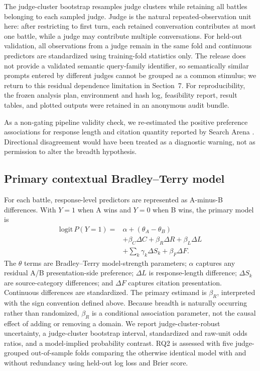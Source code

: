 \documentclass[sigconf,natbib=true,anonymous=true]{acmart}
\begin{document}
The judge-cluster bootstrap resamples judge clusters while retaining all battles belonging to each sampled judge. Judge is the natural repeated-observation unit here: after restricting to first turn, each retained conversation contributes at most one battle, while a judge may contribute multiple conversations. For held-out validation, all observations from a judge remain in the same fold and continuous predictors are standardized using training-fold statistics only. The release does not provide a validated semantic query-family identifier, so semantically similar prompts entered by different judges cannot be grouped as a common stimulus; we return to this residual dependence limitation in Section~7. For reproducibility, the frozen analysis plan, environment and hash log, feasibility report, result tables, and plotted outputs were retained in an anonymous audit bundle.

As a non-gating pipeline validity check, we re-estimated the positive preference associations for response length and citation quantity reported by Search Arena \citep{miroyan2026searcharena}. Directional disagreement would have been treated as a diagnostic warning, not as permission to alter the breadth hypothesis.

\subsection{Primary contextual Bradley--Terry model}
For each battle, response-level predictors are represented as A-minus-B differences. With $Y=1$ when A wins and $Y=0$ when B wins, the primary model is
\begin{align}
\mathrm{logit}\,P(Y=1) ={}& \alpha + (\theta_A-\theta_B) \\
&+ \beta_C\Delta C + \beta_R\Delta R + \beta_L\Delta L \\
&+ \sum_k \gamma_k\Delta S_k + \beta_F\Delta F.
\end{align}
The $\theta$ terms are Bradley--Terry model-strength parameters; $\alpha$ captures any residual A/B presentation-side preference; $\Delta L$ is response-length difference; $\Delta S_k$ are source-category differences; and $\Delta F$ captures citation presentation. Continuous differences are standardized. The primary estimand is $\beta_R$, interpreted with the sign convention defined above. Because breadth is naturally occurring rather than randomized, $\beta_R$ is a conditional association parameter, not the causal effect of adding or removing a domain. We report judge-cluster-robust uncertainty, a judge-cluster bootstrap interval, standardized and raw-unit odds ratios, and a model-implied probability contrast. RQ2 is assessed with five judge-grouped out-of-sample folds comparing the otherwise identical model with and without redundancy using held-out log loss and Brier score.
\end{document}
